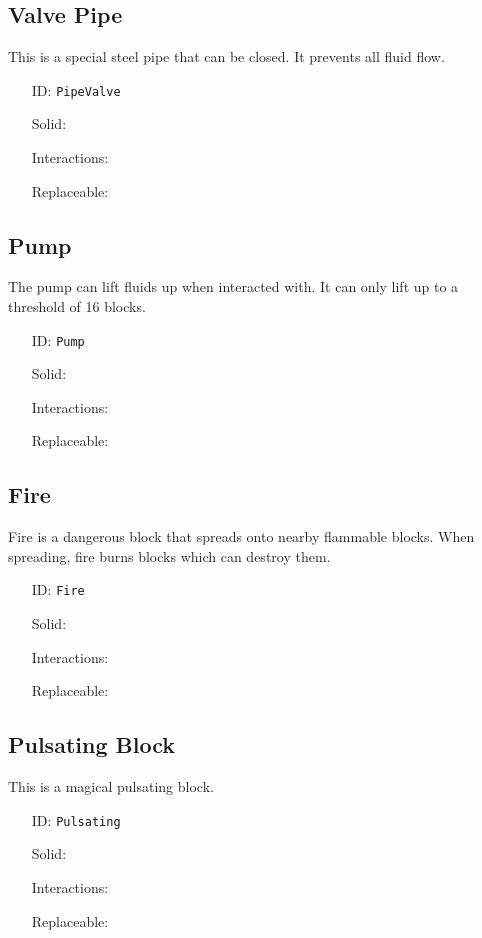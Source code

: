 \subsection{Valve Pipe}\label{subsec:blocks_valve pipe}
This is a special steel pipe that can be closed. It prevents all fluid flow.
\newline
\begin{itemize}[nosep]
\item[ID:] \texttt{PipeValve}
\item[Solid:]  \Checkmark \item[Interactions:]  \Checkmark \item[Replaceable:]  \XSolidBrush \end{itemize}

\subsection{Pump}\label{subsec:blocks_pump}
The pump can lift fluids up when interacted with.
                It can only lift up to a threshold of 16 blocks.
\newline
\begin{itemize}[nosep]
\item[ID:] \texttt{Pump}
\item[Solid:]  \Checkmark \item[Interactions:]  \Checkmark \item[Replaceable:]  \XSolidBrush \end{itemize}

\subsection{Fire}\label{subsec:blocks_fire}
Fire is a dangerous block that spreads onto nearby flammable blocks.
                When spreading, fire burns blocks which can destroy them.
\newline
\begin{itemize}[nosep]
\item[ID:] \texttt{Fire}
\item[Solid:]  \XSolidBrush \item[Interactions:]  \XSolidBrush \item[Replaceable:]  \Checkmark \end{itemize}

\subsection{Pulsating Block}\label{subsec:blocks_pulsating block}
This is a magical pulsating block.
\newline
\begin{itemize}[nosep]
\item[ID:] \texttt{Pulsating}
\item[Solid:]  \Checkmark \item[Interactions:]  \Checkmark \item[Replaceable:]  \XSolidBrush \end{itemize}

